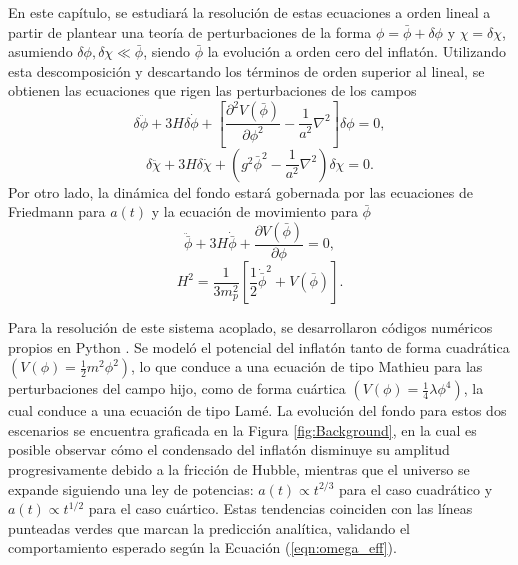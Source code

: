 En este capítulo, se estudiará la resolución de estas ecuaciones a orden lineal a partir de plantear una teoría de perturbaciones de la forma $\phi = \bar{\phi} + \delta \phi$ y $\chi = \delta \chi$, asumiendo $\delta \phi, \delta \chi \ll \bar{\phi}$, siendo $\bar{\phi}$ la evolución a orden cero del inflatón. Utilizando esta descomposición y descartando los términos de orden superior al lineal, se obtienen las ecuaciones que rigen las perturbaciones de los campos
\begin{equation}
    \delta \ddot{\phi} + 3 H \delta \dot{\phi} + \left[ \frac{\partial^2 V \left( \bar{\phi} \right)}{\partial \phi^2} - \frac{1}{a^2} \nabla^2 \right] \delta \phi = 0,
\end{equation}
\begin{equation}
    \delta \ddot{\chi} + 3 H \delta \dot{\chi} + \left( g^2 \bar{\phi}^2 - \frac{1}{a^2} \nabla^2 \right) \delta \chi = 0.    
\end{equation}
Por otro lado, la dinámica del fondo estará gobernada por las ecuaciones de Friedmann para $a(t)$ y la ecuación de movimiento para $\bar{\phi}$
\begin{equation}
    \ddot{\bar{\phi}} + 3 H \dot{\bar{\phi}} + \frac{\partial V \left( \bar{\phi} \right)}{\partial \phi} = 0,
\end{equation}
\begin{equation}
    H^2 = \frac{1}{3 m_p^2} \left[ \frac{1}{2} \dot{\bar{\phi}}^2 + V \left( \bar{\phi} \right) \right].
\end{equation}

Para la resolución de este sistema acoplado, se desarrollaron códigos numéricos propios en Python \cite{Git}. Se modeló el potencial del inflatón tanto de forma cuadrática $\left( V(\phi) = \frac{1}{2} m^2 \phi^2 \right)$, lo que conduce a una ecuación de tipo Mathieu para las perturbaciones del campo hijo, como de forma cuártica $\left( V(\phi) = \frac{1}{4} \lambda \phi^4 \right)$, la cual conduce a una ecuación de tipo Lamé. La evolución del fondo para estos dos escenarios se encuentra graficada en la Figura \ref{fig:Background}, en la cual es posible observar cómo el condensado del inflatón disminuye su amplitud progresivamente debido a la fricción de Hubble, mientras que el universo se expande siguiendo una ley de potencias: $a(t) \propto t^{2/3}$ para el caso cuadrático y $a(t) \propto t^{1/2}$ para el caso cuártico. Estas tendencias coinciden con las líneas punteadas verdes que marcan la predicción analítica, validando el comportamiento esperado según la Ecuación (\ref{eqn:omega_eff}).

